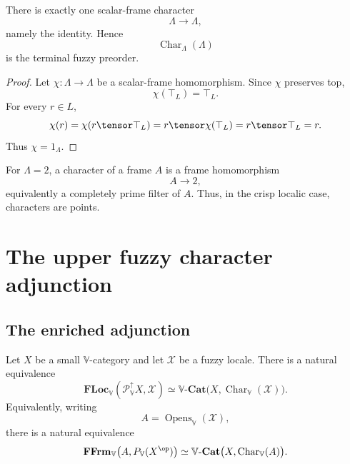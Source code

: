 \begin{proposition}
\label{prop:characters-truth-value-frame}
There is exactly one scalar-frame character
\[
    \Lambda\to\Lambda,
\]
namely the identity.  Hence
\[
    \operatorname{Char}_\Lambda(\Lambda)
\]
is the terminal fuzzy preorder.
\end{proposition}

\begin{proof}
Let \(\chi:\Lambda\to\Lambda\) be a scalar-frame homomorphism.  Since \(\chi\)
preserves top,
\[
    \chi(\top_L)=\top_L.
\]
For every \(r\in L\),
\[
    \chi(r)
    =
    \chi(r\tensor\top_L)
    =
    r\tensor\chi(\top_L)
    =
    r\tensor\top_L
    =
    r.
\]
Thus \(\chi=1_\Lambda\).
\end{proof}

\begin{example}
\label{ex:fuzzy-characters-crisp}
For \(\Lambda=2\), a character of a frame \(A\) is a frame homomorphism
\[
    A\to 2,
\]
equivalently a completely prime filter of \(A\).  Thus, in the crisp localic case,
characters are points.
\end{example}

\section{The upper fuzzy character adjunction}
\label{sec:upper-fuzzy-character-adjunction}

\subsection{The enriched adjunction}
\label{subsec:upper-character-adjunction-enriched}

\begin{theorem}
\label{thm:upper-fuzzy-character-adjunction-enriched}
Let \(X\) be a small \(\mathbb V\)-category and let \(\mathcal X\) be a fuzzy
locale.  There is a natural equivalence
\[
    \mathbf{FLoc}_{\mathbb V}
    (\mathcal P_{\mathbb V}^{\uparrow}X,\mathcal X)
    \simeq
    \mathbb V\text{-}\mathbf{Cat}
    \bigl(
        X,
        \operatorname{Char}_{\mathbb V}(\mathcal X)
    \bigr).
\]
Equivalently, writing
\[
    A=\operatorname{Opens}_{\mathbb V}(\mathcal X),
\]
there is a natural equivalence
\[
    \mathbf{FFrm}_{\mathbb V}
    \bigl(
        A,
        P_{\mathbb V}(X^{\op})
    \bigr)
    \simeq
    \mathbb V\text{-}\mathbf{Cat}
    \bigl(
        X,
        \operatorname{Char}_{\mathbb V}(A)
    \bigr).
\]
\end{theorem}

